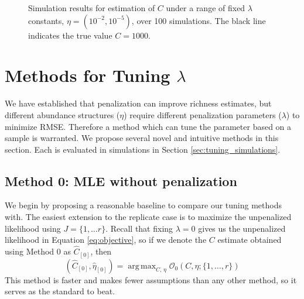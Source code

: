 \documentclass[oupdraft]{bio}
\DeclareMathOperator*{\argmax}{arg\,max}
\begin{document}
\begin{figure}[p]
\caption{Simulation results for estimation of $C$ under a range of fixed $\lambda$ constants, $\eta = (10^{-2}, 10^{-5})$, over 100 simulations.  The black line indicates the true value $C = 1000$.
\label{fig:fixed_lambda_2}}
\centering{}
\end{figure}


%
%
%
\section{Methods for Tuning $\lambda$}
\label{sec:tuning_proposals}

We have established that penalization can improve richness estimates, but different abundance structures ($\eta$) require different penalization parameters ($\lambda$) to minimize RMSE.  Therefore a method which can tune the parameter based on a sample is warranted.  We propose several novel and intuitive methods in this section.  Each is evaluated in simulations in Section \ref{sec:tuning_simulations}.

\setcounter{subsection}{-1}
\subsection{Method 0: MLE without penalization}
We begin by proposing a reasonable baseline to compare our tuning methods with.
 The easiest extension to the replicate case is to maximize the unpenalized likelihood using $J = \{1, \dots r \}$.  Recall that fixing $\lambda = 0$ gives us the unpenalized likelihood in Equation \ref{eq:objective}, so if we denote the $C$ estimate obtained using Method 0 as $\widehat{C}_{[0]}$, then
\begin{equation}
\left(\widehat{C}_{[0]},  \widehat{\eta}_{[0]} \right) = \argmax_{C, \, \eta}  \mathcal{O}_{0}\left(C, \eta ; \{1, \dots , r\} \right) \label{eq:c_hat_0}
\end{equation}
This method is faster and makes fewer assumptions than any other method, so it serves as the standard to beat.
\end{document}
